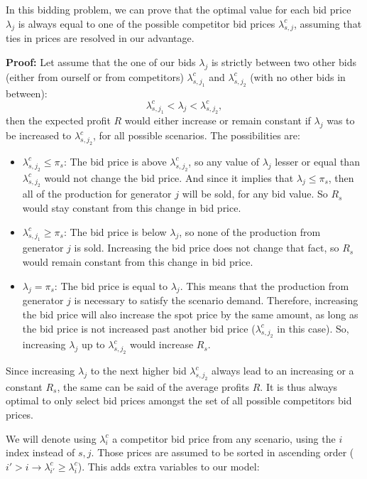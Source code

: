 \documentclass[12pt]{article}
\begin{document}
In this bidding problem, we can prove that the optimal value for each bid
price $\lambda_j$ is always equal to one of the possible competitor bid
prices $\lambda^c_{s,j}$, assuming that ties in prices are resolved in our
advantage.

\textbf{Proof:} Let assume that the one of our bids $\lambda_j$ is strictly
between two other bids (either from ourself or from competitors)
$\lambda^c_{s,j_1}$ and $\lambda^c_{s,j_2}$ (with no other bids in between):
\begin{equation}
\lambda^c_{s,j_1} < \lambda_j < \lambda^c_{s,j_2},
\end{equation}
then the expected profit $R$ would either increase or remain constant if
$\lambda_j$ was to be increased to $\lambda^c_{s,j_2}$, for all possible
scenarios. The possibilities are:
\begin{itemize}
\item $\lambda^c_{s,j_2} \le \pi_s$: The bid price is above $\lambda^c_{s,j_2}$,
so any value of $\lambda_j$ lesser or equal than $\lambda^c_{s,j_2}$ would
not change the
bid price. And since it implies that $\lambda_j \le \pi_s$, then all of the
production for generator $j$ will be sold, for any bid value.
So $R_s$ would stay constant from this change in bid price.
\item $\lambda^c_{s,j_1} \ge \pi_s$: The bid price is below $\lambda_j$, so
none of the production from generator $j$ is sold. Increasing the bid price
does not change that fact, so $R_s$ would remain constant from this change
in bid price.
\item $\lambda_j = \pi_s$: The bid price is equal to $\lambda_j$. This means
that the production from generator $j$ is necessary to satisfy the scenario
demand. Therefore, increasing the bid price will also increase the spot
price by the same amount, as long as the bid price is not increased past
another bid price ($\lambda^c_{s,j_2}$ in this case). So, increasing
$\lambda_j$ up to $\lambda^c_{s,j_2}$ would increase $R_s$.
\end{itemize}
Since increasing $\lambda_j$ to the next higher bid $\lambda^c_{s,j_2}$
always lead to an increasing or a constant $R_s$, the same can be said of
the average profits $R$. It is thus always optimal to only select bid prices
amongst the set of all possible competitors bid prices.

We will denote using $\lambda^c_i$ a competitor bid price from any scenario,
using the $i$ index instead of $s,j$. Those prices are assumed to be
sorted in ascending order ($i' > i \rightarrow \lambda^c_{i'} \ge \lambda^c_i$).
This adds extra variables to our model:
\end{document}
